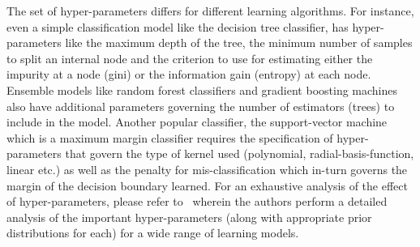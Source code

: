 The set of hyper-parameters differs for different learning algorithms. For instance, even a simple classification model like the decision tree classifier, has hyper-parameters like the maximum depth of the tree, the minimum number of samples to split an internal node and the criterion to use for estimating either the impurity at a node (gini) or the information gain (entropy) at each node. Ensemble models like random forest classifiers and gradient boosting machines also have additional parameters governing the number of estimators (trees) to include in the model. Another popular classifier, the support-vector machine which is a maximum margin classifier requires the specification of hyper-parameters that govern the type of kernel used (polynomial, radial-basis-function, linear etc.) as well as the penalty for mis-classification which in-turn governs the margin of the decision boundary learned. For an exhaustive analysis of the effect of hyper-parameters, please refer to~\cite{van2018hyperparameter} wherein the authors perform a detailed analysis of the important hyper-parameters (along with appropriate prior distributions for each) for a wide range of learning models.
